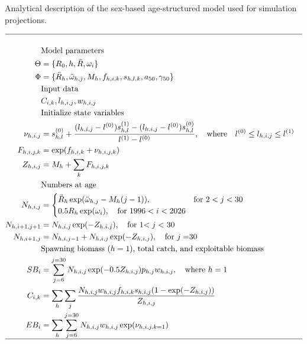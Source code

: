 \begin{table}
	\caption{Analytical description of the sex-based age-structured model used for simulation projections.}
	\label{tab:model_description}
	\begin{center}
		\tableEq
		\begin{align}
			\hline \nonumber\\
			&\mbox{Model parameters} \nonumber\\
			\Theta &= \{R_0,h,\bar{R},\omega_{i}\}  \label{T1.1}\\
			\Phi   &= \{\ddot{R}_h,\ddot{\omega}_{h,j},M_h,f_{h,i,k},s_{h,l,k},a_{50},\gamma_{50}\}  \label{T1.2}\\
			&\mbox{Input data} \nonumber\\
			&C_{i,k}, l_{h,i,j},w_{h,i,j} \label{T1.3}\\
			&\mbox{Initialize state variables }\nonumber\\
			\nu_{h,i,j} &= s_{h,l}^{(0)}+ 
			\frac{ (l_{h,i,j}-l^{(0)})s_{h,l}^{(1)} - (l_{h,i,j}-l^{(0)})s_{h,l}^{(0)} }
			{ l^{(1)}-l^{(0)} }, \quad \mbox{where}
			\quad  l^{(0)} \leq l_{h,i,j} \leq l^{(1)} \label{T1.4}\\
			F_{h,i,j,k} &= \exp(f_{h,i,k} + \nu_{h,i,j,k}) \label{T1.5}\\
			Z_{h,i,j} & = M_h + \sum_k F_{h,i,j,k} \label{T1.6} \\
			&\mbox{Numbers at age}\nonumber\\
			N_{h,i,j} &= 
			\begin{cases}
				\ddot{R}_{h}\exp(\ddot{\omega}_{h,j}-M_h (j-1)), & \mbox{for $2<j<30$}\\
				0.5 R_h\exp(\omega_{i}), \quad \mbox{for $1996<i<2026$}\\
			\end{cases} \label{T1.7}\\
			N_{h,i+1,j+1} &= N_{h,i,j} \exp(-Z_{h,i,j}), \quad \mbox{for 1$<j<$ 30}\label{T1.8}\\
			N_{h,i+1,j} &= N_{h,i,j-1}+N_{h,i,j} \exp(-Z_{h,i,j}) , 
			\quad \mbox{for $j =$30}\label{T1.9}\\
			&\mbox{Spawning biomass ($h=1$), total catch, and exploitable biomass}\nonumber\\
			SB_{i} &= \sum_{j=6}^{j=30} N_{h,i,j}\exp(-0.5Z_{h,i,j}) p_{h,j} w_{h,i,j},
			\quad \mbox{where $h=1$}\label{T1.10}\\
			C_{i,k} &=\sum_h \sum_j \frac{N_{h,i,j} w_{h,i,j} f_{h,i,k} s_{h,i,j}
			(1-\exp(-Z_{h,i,j}))}{Z_{h,i,j}}\label{T1.11}\\
			EB_{i} &= \sum_h \sum_{j=6}^{j=30} N_{h,i,j} w_{h,i,j} \exp(\nu_{h,i,j,k=1})\\
			\hline \nonumber
		\end{align}
		\normalEq
	\end{center}
\end{table}

